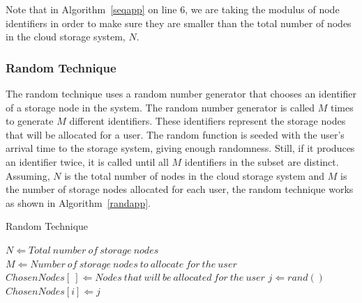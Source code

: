 \documentclass[preprint,12pt]{elsarticle}
\begin{document}
Note that in Algorithm~\ref{seqapp} on line 6, we are taking the modulus of node identifiers in order to
make sure they are smaller than the total number of nodes in the cloud
storage system, $N$.

\subsubsection{Random Technique}
The random technique uses a random number generator that chooses an identifier of a storage node
in the system. The random number generator is called $M$ times to generate $M$ different identifiers.
These identifiers represent the storage nodes that will be allocated for a user. The
random function is seeded with the user's arrival time to the storage system, giving enough
randomness. Still, if it produces an identifier twice, it is called until all $M$ identifiers
in the subset are distinct. Assuming, $N$ is the total number of nodes in the
cloud storage system and $M$ is the number of storage nodes allocated for each user, the random
technique works as shown in Algorithm~\ref{randapp}.

\begin{algorithm}[!htbp]
\caption{Random Technique}
\label{randapp}
\begin{algorithmic}[1]
    \STATE $N \Leftarrow Total\ number\ of\ storage\ nodes$
    \STATE $M \Leftarrow Number\ of\ storage\ nodes\ to\ allocate\ for\ the\ user$
    \STATE $ChosenNodes[\ ] \Leftarrow Nodes\ that\ will\ be\ allocated\ for\ the\ user$
            \STATE $j \Leftarrow rand()$
        \ENDWHILE
        \STATE $ChosenNodes[i] \Leftarrow j$
    \ENDFOR
\end{algorithmic}
\end{algorithm}
\end{document}
